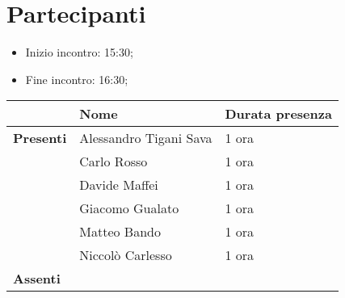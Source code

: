\section{Partecipanti}

\begin{itemize}
    \item Inizio incontro: 15:30;
    \item Fine incontro: 16:30;
\end{itemize}


\begin{center}
{\renewcommand{\arraystretch}{1.5}
\begin{tabular}{lll}
	                    & \textbf{Nome}  & \textbf{Durata presenza} \\
	\hline
	\textbf{Presenti}   & Alessandro Tigani Sava	& 1 ora	\\  
						& Carlo Rosso  				& 1 ora	\\
						& Davide Maffei          	& 1 ora	\\ 
						& Giacomo Gualato 			& 1 ora \\
						& Matteo Bando           	& 1 ora	\\   
						& Niccolò Carlesso 			& 1 ora \\  
	\hline
	\textbf{Assenti}	&             				&      	\\
\end{tabular}	
}
\end{center}